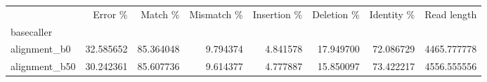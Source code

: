 \begin{tabular}{lrrrrrrr}
\toprule
{} &    Error \% &    Match \% &  Mismatch \% &  Insertion \% &  Deletion \% &  Identity \% &  Read length \\
basecaller    &            &            &             &              &             &             &              \\
\midrule
alignment\_b0  &  32.585652 &  85.364048 &    9.794374 &     4.841578 &   17.949700 &   72.086729 &  4465.777778 \\
alignment\_b50 &  30.242361 &  85.607736 &    9.614377 &     4.777887 &   15.850097 &   73.422217 &  4556.555556 \\
\bottomrule
\end{tabular}
